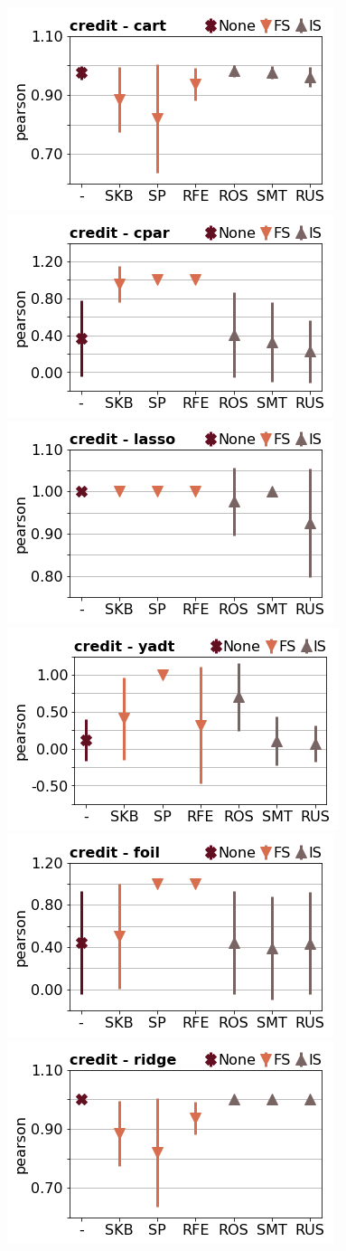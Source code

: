 \documentclass[runningheads,a4paper]{llncs}
\begin{document}
\begin{figure}[!h]
\includegraphics[width=0.32\linewidth]{fig/preps_credit_DT_sklearn_sample_pearson.png}
\includegraphics[width=0.32\linewidth]{fig/preps_credit_RB_cpar_sample_pearson.png}
\includegraphics[width=0.32\linewidth]{fig/preps_credit_LM_lasso_sample_pearson.png}
\includegraphics[width=0.32\linewidth]{fig/preps_credit_DT_yadt_sample_pearson.png}
\includegraphics[width=0.32\linewidth]{fig/preps_credit_RB_foil_sample_pearson.png}
\includegraphics[width=0.32\linewidth]{fig/preps_credit_LM_ridge_sample_pearson.png}
\end{figure}
\end{document}
